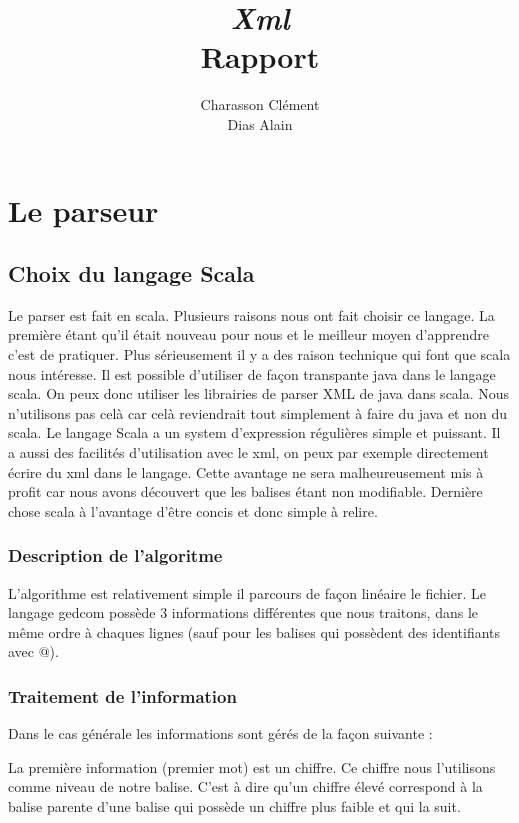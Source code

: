 \documentclass[12pt,a4paper]{report}
\title{\huge \textbf {\emph{Xml} \\Rapport}}
\author{Charasson Clément \\ Dias Alain}
\begin{document}
\maketitle

\chapter{Le parseur}

\section{Choix du langage Scala}

Le parser est fait en scala. Plusieurs raisons nous ont fait choisir ce
langage. La première étant qu'il était nouveau pour nous et le meilleur moyen
d'apprendre c'est de pratiquer. Plus sérieusement il y a des raison technique
qui font que scala nous intéresse. Il est possible d'utiliser de façon
transpante java dans le langage scala. On peux donc utiliser les librairies de
parser XML de java dans scala. Nous n'utilisons pas celà car celà reviendrait
tout simplement à faire du java et non du scala.
Le langage Scala a un system d'expression régulières simple et puissant. Il a
aussi des facilités d'utilisation avec le xml, on peux par exemple directement 
écrire du xml dans le langage. Cette avantage ne sera malheureusement mis à 
profit car nous avons découvert que les balises étant non modifiable.
Dernière chose scala à l'avantage d'être concis et donc simple à
relire.


\subsection{Description de l'algoritme}


L'algorithme est relativement simple il parcours de façon linéaire le fichier.
Le langage gedcom possède 3 informations différentes que nous
traitons, dans le même ordre à chaques lignes (sauf pour les balises
qui possèdent des identifiants avec @).


\subsection{Traitement de l'information}

Dans le cas générale les informations sont gérés de la façon suivante :

La première information (premier mot) est un chiffre. Ce chiffre nous l'utilisons
comme niveau de notre balise. C'est à dire qu'un chiffre élevé correspond à la
balise parente d'une balise qui possède un chiffre plus faible et qui la suit.
\end{document}
